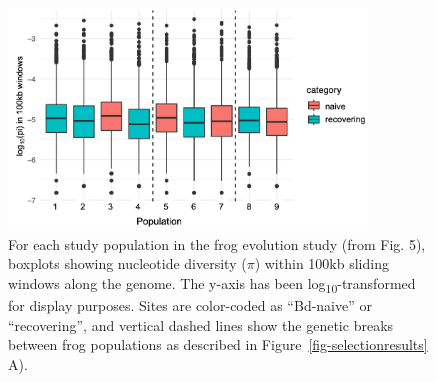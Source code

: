 \documentclass[9pt,twoside,lineno]{pnas-new-SI}
\begin{document}
\newpage

\begin{figure}

{\centering \includegraphics[width=0.85\textwidth]{figures/boxplot_genomewide_pi_by_pop.png}

}

\caption{\label{fig-boxplot-genomewide-pi-by-pop}For each study
population in the frog evolution study (from
Fig. 5), boxplots showing nucleotide
diversity (\(\pi\)) within 100kb sliding windows along the genome. The
y-axis has been log\textsubscript{10}-transformed for display purposes.
Sites are color-coded as ``Bd-naive'' or ``recovering'', and vertical
dashed lines show the genetic breaks between frog populations as
described in Figure~\ref{fig-selectionresults} A).}

\end{figure}\clearpage

\newpage
\end{document}
